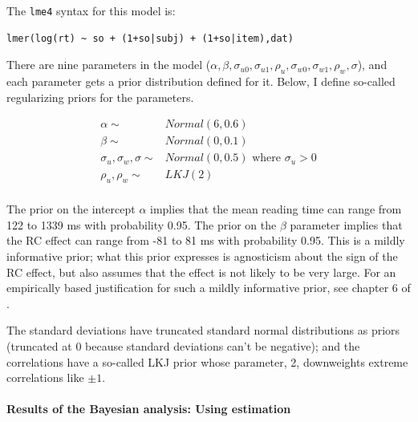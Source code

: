 \documentclass{ar-1col}\usepackage[]{graphicx}\usepackage[]{color}
\begin{document}
The \texttt{lme4} syntax for this model is:

\begin{verbatim}
lmer(log(rt) ~ so + (1+so|subj) + (1+so|item),dat)
\end{verbatim}

There are nine parameters in the model ($\alpha, \beta, \sigma_{u0}, \sigma_{u1}, \rho_u, \sigma_{w0}, \sigma_{w1}, \rho_w,\sigma$), and each parameter gets a prior distribution defined for it. Below, I define so-called regularizing priors for the parameters. 


\begin{align*}
\alpha \sim& \mathit{Normal}(6,0.6)\\
\beta \sim& \mathit{Normal}(0,0.1)\\
\sigma_u, \sigma_w, \sigma \sim& \mathit{Normal}(0,0.5) \text{ where } \sigma_u>0\\
\rho_u, \rho_w \sim&  LKJ(2)\\
\end{align*}

The prior on the intercept $\alpha$ implies that the mean reading time can range from 122 to 1339 ms with probability 0.95. The prior on the  $\beta$ parameter implies that the RC effect can range from -81 to 81 ms with probability 0.95. This is a mildly informative prior; what this prior expresses is agnosticism about the sign of the RC effect, but also assumes that the effect is not likely to be very large. For an empirically based justification for such a mildly informative prior, see chapter 6 of \citet{NicenboimEtAlBayes2019}.

The standard deviations have truncated standard normal distributions as priors (truncated at 0 because standard deviations can't be negative); and the correlations have a so-called LKJ prior whose parameter, 2, downweights extreme correlations like $\pm 1$.













\paragraph{Results of the Bayesian analysis: Using estimation}
\end{document}
